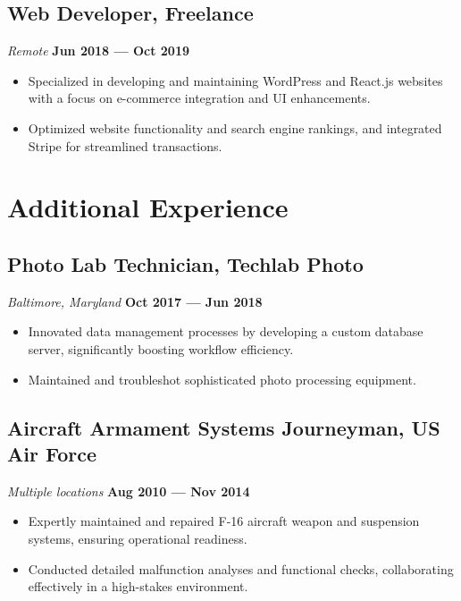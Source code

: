 \documentclass[a4paper,10pt]{article}
\begin{document}
\subsection*{Web Developer, Freelance}
\textit{Remote} \hfill \textbf{Jun 2018 — Oct 2019}
\begin{itemize}[leftmargin=1.5em]
    \item Specialized in developing and maintaining WordPress and React.js websites with a focus on e-commerce integration and UI enhancements.
    \item Optimized website functionality and search engine rankings, and integrated Stripe for streamlined transactions.
\end{itemize}

\section*{Additional Experience}

\subsection*{Photo Lab Technician, Techlab Photo}
\textit{Baltimore, Maryland} \hfill \textbf{Oct 2017 — Jun 2018}
\begin{itemize}[leftmargin=1.5em]
    \item Innovated data management processes by developing a custom database server, significantly boosting workflow efficiency.
    \item Maintained and troubleshot sophisticated photo processing equipment.
\end{itemize}

\subsection*{Aircraft Armament Systems Journeyman, US Air Force}
\textit{Multiple locations} \hfill \textbf{Aug 2010 — Nov 2014}
\begin{itemize}[leftmargin=1.5em]
    \item Expertly maintained and repaired F-16 aircraft weapon and suspension systems, ensuring operational readiness.
    \item Conducted detailed malfunction analyses and functional checks, collaborating effectively in a high-stakes environment.
\end{itemize}
\end{document}
